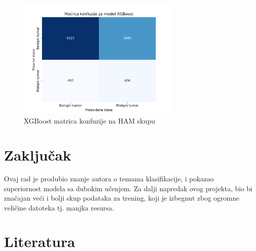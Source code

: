 \documentclass{article}
\begin{document}
\begin{figure}[H]
    \centering
    \includegraphics[width=0.7\textwidth]{rezultati/XGBoost_HAM_matrica_konfuzije.png} 
    \caption{XGBoost matrica konfuzije na HAM skupu} 
    \label{XGBoost HAM matrica konfuzije}
\end{figure}

\section{Zaključak}
Ovaj rad je produbio znanje autora o temama klasifikacije, i pokazao superiornost modela sa dubokim učenjem. Za dalji napredak ovog projekta, bio bi značajan veći i bolji skup podataka za trening, koji je izbegnut zbog ogromne veličine datoteka tj. manjka resursa.

\section{Literatura}
\end{document}
